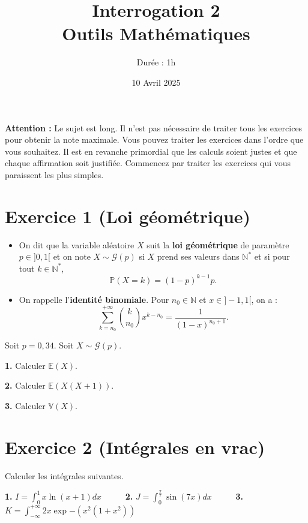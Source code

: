 \documentclass{article}
\title{Interrogation 2 \\
Outils Mathématiques}
\author{Durée : 1h}
\date{10 Avril 2025}
\newcommand{\E}{\mathbb{E}}
\newcommand{\prob}{\mathbb{P}}
\begin{document}
\maketitle

\textbf{Attention :} Le sujet est long. Il n'est pas nécessaire de traiter tous les exercices pour obtenir la note maximale. Vous pouvez traiter les exercices dans l'ordre que vous souhaitez. Il est en revanche primordial que les calculs soient justes et que chaque affirmation soit justifiée. Commencez par traiter les exercices qui vous paraissent les plus simples.

\section*{Exercice 1 (Loi géométrique)}

\begin{tcolorbox}[colframe=gray!50, colback=white, title=Rappels, fonttitle=\bfseries,
  boxrule=0.5pt, arc=0mm]
\begin{itemize}
    \item On dit que la variable aléatoire $X$ suit la \textbf{loi géométrique} de paramètre $p \in ]0,1[$ et on note $X \sim \mathcal{G}(p)$ si $X$ prend ses valeurs dans $\mathbb{N}^*$ et si pour tout $k \in \mathbb{N}^*$, 
    \[
    \prob(X = k) = (1-p)^{k-1} p.
    \]

    \item On rappelle l'\textbf{identité binomiale}. Pour $n_0 \in \mathbb{N}$ et $x \in ]-1,1[$, on a :
    \[
    \sum_{k=n_0}^{+\infty} \binom{k}{n_0} x^{k - n_0} = \frac{1}{(1 - x)^{n_0 + 1}}.
    \]
\end{itemize}
\end{tcolorbox}

Soit $p=0{,}34$. Soit $X \sim \mathcal{G}(p)$. 

\textbf{1.} Calculer $\E (X)$. 

\textbf{2.} Calculer $\E (X(X+1))$. 

\textbf{3.} Calculer $\mathbb{V} (X)$. 

\section*{Exercice 2 (Intégrales en vrac)}

Calculer les intégrales suivantes.

\textbf{1.} $I=\int_0^1 x \ln (x+1) dx$ \ \ \ \ \ \textbf{2.} $J=\int_0^{\frac{\pi}{7}} \sin (7x) dx$ \ \ \ \ \ \textbf{3.} $K = \int_{- \infty}^{+ \infty} 2x \exp{-(x^2(1+x^2))}$
\end{document}
